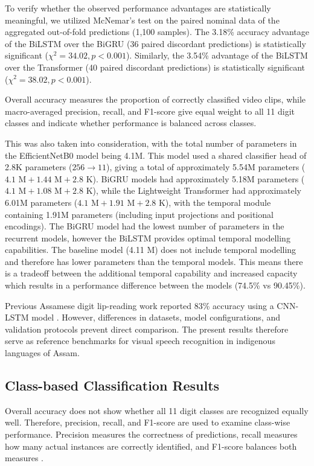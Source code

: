 \documentclass[journal]{IEEEtran}
\begin{document}
To verify whether the observed performance advantages are statistically meaningful, we utilized McNemar's test on the paired nominal data of the aggregated out-of-fold predictions (1,100 samples). The 3.18\% accuracy advantage of the  BiLSTM over the BiGRU (36 paired discordant predictions) is statistically significant ($\chi^2 = 34.02, p < 0.001$). Similarly, the 3.54\% advantage of the BiLSTM over the Transformer (40 paired discordant predictions) is statistically significant ($\chi^2 = 38.02, p < 0.001$).

Overall accuracy measures the proportion of correctly classified video clips, while macro-averaged precision, recall, and F1-score give equal weight to all 11 digit classes and indicate whether performance is balanced across classes.

This was also taken into consideration, with the total number of parameters in the EfficientNetB0 model being 4.1M. This model used a shared classifier head of 2.8K parameters ($256 \to 11$), giving a total of approximately 5.54M parameters ($4.1\text{ M} + 1.44\text{ M} + 2.8\text{ K}$). BiGRU models had approximately 5.18M parameters ($4.1\text{ M} + 1.08\text{ M} + 2.8\text{ K}$), while the Lightweight Transformer had approximately 6.01M parameters ($4.1\text{ M} + 1.91\text{ M} + 2.8\text{ K}$), with the temporal module containing 1.91M parameters (including input projections and positional encodings). The BiGRU model had the lowest number of parameters in the recurrent models, however the BiLSTM provides optimal temporal modelling capabilities. The baseline model (4.11 M) does not include temporal modelling and therefore has lower parameters than the temporal models. This means there is a tradeoff between the additional temporal capability and increased capacity which results in a performance difference between the models (74.5\% vs 90.45\%).

Previous Assamese digit lip-reading work reported 83\% accuracy using a CNN-LSTM model \cite{prasad2025analysis}. However, differences in datasets, model configurations, and validation protocols prevent direct comparison. The present results therefore serve as reference benchmarks for visual speech recognition in indigenous languages of Assam.

\subsection{Class-based Classification Results}

Overall accuracy does not show whether all 11 digit classes are recognized equally well. Therefore, precision, recall, and F1-score are used to examine class-wise performance. Precision measures the correctness of predictions, recall measures how many actual instances are correctly identified, and F1-score balances both measures \cite{sokolova2009systematic}.
\end{document}
